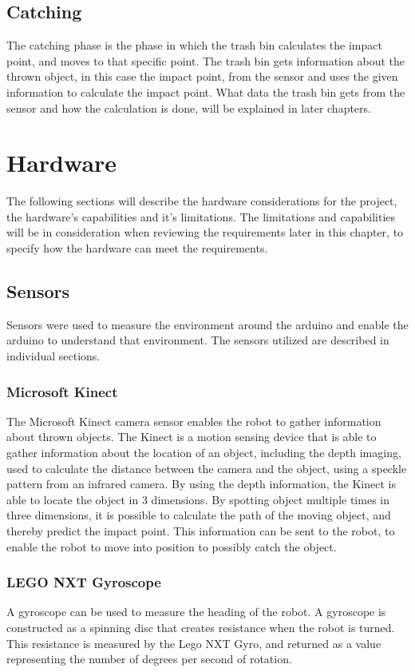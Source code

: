 \subsection{Catching}
\label{sec:CatchingAnalysis}
The catching phase is the phase in which the trash bin calculates the impact point, and moves to that specific point. The trash bin gets information about the thrown object, in this case the impact point, from the sensor and uses the given information to calculate the impact point. What data the trash bin gets from the sensor and how the calculation is done, will be explained in later chapters. 

\section{Hardware}
\label{sec:Hardware} 
The following sections will describe the hardware considerations for the project, the hardware’s capabilities and it’s limitations. The limitations and capabilities will be in consideration when reviewing the requirements later in this chapter, to specify how the hardware can meet the requirements.

\subsection{Sensors}
\label{sec:Sensors}
Sensors were used to measure the environment around the arduino and enable the arduino to understand that environment. The sensors utilized are described in individual sections. 

\subsubsection{Microsoft Kinect}
\label{sec:Microsoft Kinect}
The Microsoft Kinect camera sensor enables the robot to gather information about thrown objects. The Kinect is a motion sensing device that is able to gather information about the location of an object, including the depth imaging, used to calculate the distance between the camera and the object, using a speckle pattern from an infrared camera. By using the depth information, the Kinect is able to locate the object in 3 dimensions.
By spotting object multiple times in three dimensions, it is possible to calculate the path of the moving object, and thereby predict the impact point. This information can be sent to the robot, to enable the robot to move into position to possibly catch the object.

\subsubsection{LEGO NXT Gyroscope}
\label{sec:LEGO NXT Gyroscope}
A gyroscope can be used to measure the heading of the robot. A gyroscope is constructed as a spinning disc that creates resistance when the robot is turned. This resistance is measured by the Lego NXT Gyro, and returned as a value representing the number of degrees per second of rotation. 

